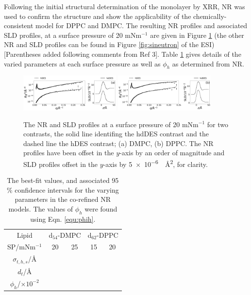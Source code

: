 \documentclass[amsmath,amssymb,twocolumn,superscriptaddress]{revtex4-1}
\begin{document}
Following the initial structural determination of the monolayer by XRR, NR was used to confirm the structure and show the applicability of the chemically-consistent model for DPPC and DMPC.
The resulting NR profiles and associated SLD profiles, at a surface pressure of 20 mNm$^{-1}$ are given in Figure \ref{fig:neutron} (the other NR and SLD profiles can be found in Figure \ref{fig:sineutron} of the ESI) [Parentheses added following comments from Ref 3].
Table \ref{tab:neutron} gives details of the varied parameters at each surface pressure as well as $\phi_h$ as determined from NR.
%
\begin{figure}
    \centering
  \includegraphics[width=0.45\textwidth]{figures/dmpc_20n_ref_sld}
    \includegraphics[width=0.45\textwidth]{figures/dppc_20n_ref_sld}
    \caption{\small The NR and SLD profiles at a surface pressure of
  20 mNm$^{-1}$ for two contrasts, the solid line identifing the hdDES contrast and the dashed line the hDES contrast; (a) DMPC, (b) DPPC. The NR profiles have been offset in the $y$-axis by an order of magnitude and SLD profiles offset in the $y$-axis by \SI{5e-6}{\per\square\angstrom}, for clarity.}
    \label{fig:neutron}
\end{figure}
%
%
\begin{table}
  \caption{\label{tab:neutron} The best-fit values, and associated 95 \%
  confidence intervals for the varying parameters in the co-refined NR models.
  The values of $\phi_h$ were found using Eqn. \ref{equ:phih}.}
  \begin{ruledtabular}
    \begin{tabular*}{\textwidth}{ccccc}
    Lipid & \multicolumn{2}{c}{d$_{54}$-DMPC} & \multicolumn{2}{c}{d$_{62}$-DPPC} \\
    SP/mNm$^{-1}$ & 20 & 25 & 15 & 20 \\
    \hline
    $\sigma_{t,h,s}$/\si{\angstrom} &  &  &  &  \\
    $d_t$/\si{\angstrom} &  &  &  &  \\
    \hline
    $\phi_h$/$\times10^{-2}$ &  &  &  &  \\
    \end{tabular*}
  \end{ruledtabular}
\end{table}
%
\end{document}
